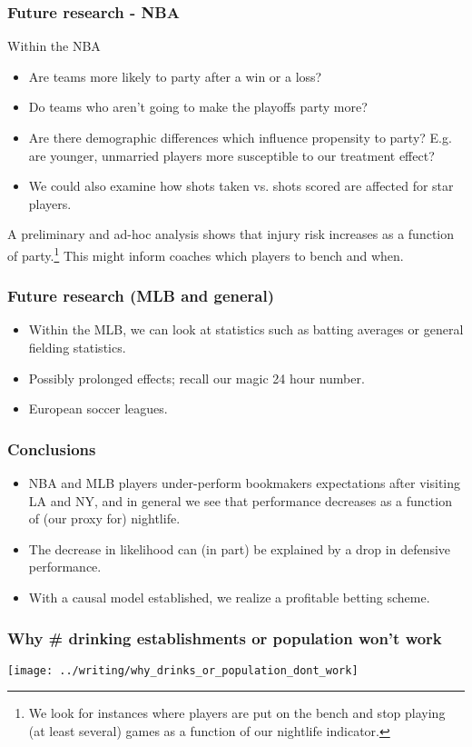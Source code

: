\documentclass{beamer}
\begin{document}
\begin{frame}   \frametitle{Future research - NBA}
  Within the NBA
  \begin{itemize}     
    \item Are teams more likely to party after a win or a       loss?
    \item Do teams who aren't going to make the playoffs party more?
    \item Are there demographic differences which influence propensity to party? E.g. are younger, unmarried players more susceptible to our treatment effect?
    \item We could also examine how shots taken vs. shots scored are affected for star players.
  \end{itemize}
  \vspace{12pt}  A preliminary and ad-hoc analysis shows that injury risk increases as a function of party.\footnote{We look for instances where players are put on the bench and stop playing (at least several) games as a function of our nightlife indicator.}
  This might inform coaches which players to bench and when.

\end{frame}

\begin{frame}   \frametitle{Future research (MLB and general)}
  \begin{itemize}     
  \item Within the MLB, we can look at statistics such as batting averages or general fielding statistics. 
    \item Possibly prolonged effects; recall our magic 24 hour number.
    \item European soccer leagues.   \end{itemize} \end{frame}

\begin{frame}   \frametitle{Conclusions}
  \begin{itemize}     \item NBA and MLB players under-perform bookmakers expectations after visiting LA and NY, and in general we see that performance decreases as a function of (our proxy for) nightlife.
    \item The decrease in likelihood can (in part) be explained by a drop in defensive performance.
    \item With a causal model established, we realize a profitable betting scheme.   \end{itemize} \end{frame}

\begin{frame}   \frametitle{Why \# drinking establishments or population won't work}
  \texttt{[image: ../writing/why\_drinks\_or\_population\_dont\_work]} \end{frame}
\end{document}
